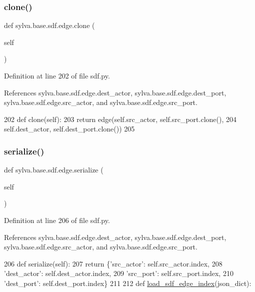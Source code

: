 \subsubsection{\texorpdfstring{clone()}{clone()}}
{\footnotesize\ttfamily def sylva.\+base.\+sdf.\+edge.\+clone (\begin{DoxyParamCaption}\item[{}]{self }\end{DoxyParamCaption})}



Definition at line 202 of file sdf.\+py.



References sylva.\+base.\+sdf.\+edge.\+dest\+\_\+actor, sylva.\+base.\+sdf.\+edge.\+dest\+\_\+port, sylva.\+base.\+sdf.\+edge.\+src\+\_\+actor, and sylva.\+base.\+sdf.\+edge.\+src\+\_\+port.


\begin{DoxyCode}
202         \textcolor{keyword}{def }clone(self):
203             \textcolor{keywordflow}{return} edge(self.src\_actor, self.src\_port.clone(),
204                         self.dest\_actor, self.dest\_port.clone())
205 
\end{DoxyCode}
\mbox{\label{classsylva_1_1base_1_1sdf_1_1edge_a10a8a20cd0052b046c627e7e22af114d}} 
\subsubsection{\texorpdfstring{serialize()}{serialize()}}
{\footnotesize\ttfamily def sylva.\+base.\+sdf.\+edge.\+serialize (\begin{DoxyParamCaption}\item[{}]{self }\end{DoxyParamCaption})}



Definition at line 206 of file sdf.\+py.



References sylva.\+base.\+sdf.\+edge.\+dest\+\_\+actor, sylva.\+base.\+sdf.\+edge.\+dest\+\_\+port, sylva.\+base.\+sdf.\+edge.\+src\+\_\+actor, and sylva.\+base.\+sdf.\+edge.\+src\+\_\+port.


\begin{DoxyCode}
206         \textcolor{keyword}{def }serialize(self):
207             \textcolor{keywordflow}{return} \{\textcolor{stringliteral}{'src\_actor'}: self.src\_actor.index,
208                     \textcolor{stringliteral}{'dest\_actor'}: self.dest\_actor.index,
209                     \textcolor{stringliteral}{'src\_port'}: self.src\_port.index,
210                     \textcolor{stringliteral}{'dest\_port'}: self.dest\_port.index\}
211 
212     \textcolor{keyword}{def }\hyperlink{namespacesylva_1_1base_1_1sdf_a67886f481ab9be68797400241d754f64}{load\_sdf\_edge\_index}(json\_dict):
\end{DoxyCode}


